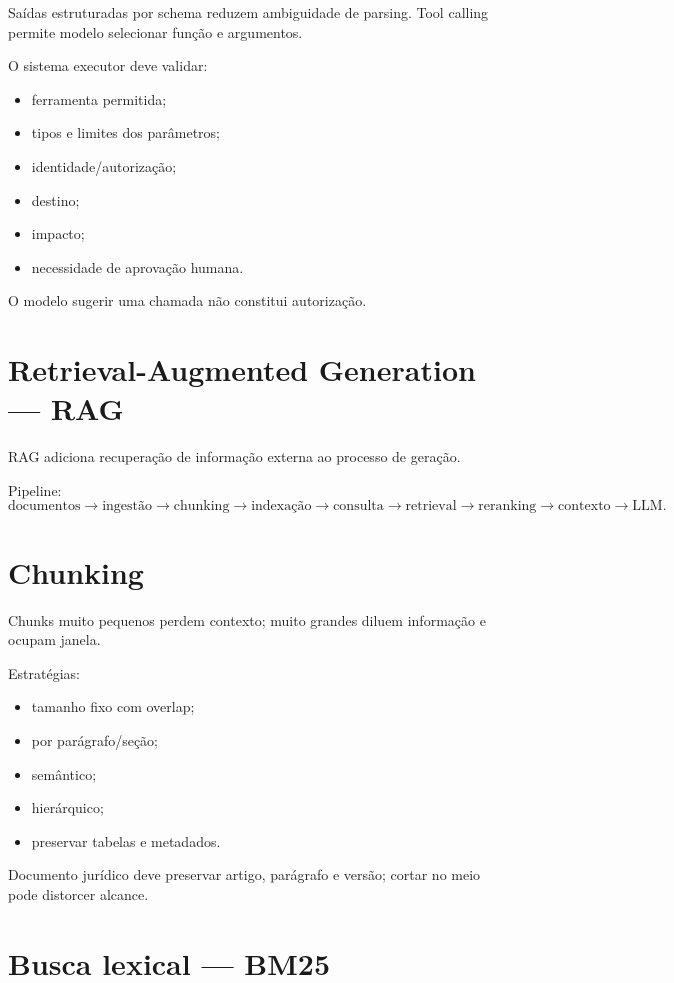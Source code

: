 Saídas estruturadas por schema reduzem ambiguidade de parsing. Tool calling permite modelo selecionar função e argumentos.

O sistema executor deve validar:
\begin{itemize}
\item ferramenta permitida;
\item tipos e limites dos parâmetros;
\item identidade/autorização;
\item destino;
\item impacto;
\item necessidade de aprovação humana.
\end{itemize}

O modelo sugerir uma chamada não constitui autorização.

\section{Retrieval-Augmented Generation — RAG}

RAG adiciona recuperação de informação externa ao processo de geração.

Pipeline:
\[
\text{documentos}
\rightarrow
\text{ingestão}
\rightarrow
\text{chunking}
\rightarrow
\text{indexação}
\rightarrow
\text{consulta}
\rightarrow
\text{retrieval}
\rightarrow
\text{reranking}
\rightarrow
\text{contexto}
\rightarrow
\text{LLM}.
\]

\section{Chunking}

Chunks muito pequenos perdem contexto; muito grandes diluem informação e ocupam janela.

Estratégias:
\begin{itemize}
\item tamanho fixo com overlap;
\item por parágrafo/seção;
\item semântico;
\item hierárquico;
\item preservar tabelas e metadados.
\end{itemize}

Documento jurídico deve preservar artigo, parágrafo e versão; cortar no meio pode distorcer alcance.

\section{Busca lexical — BM25}

